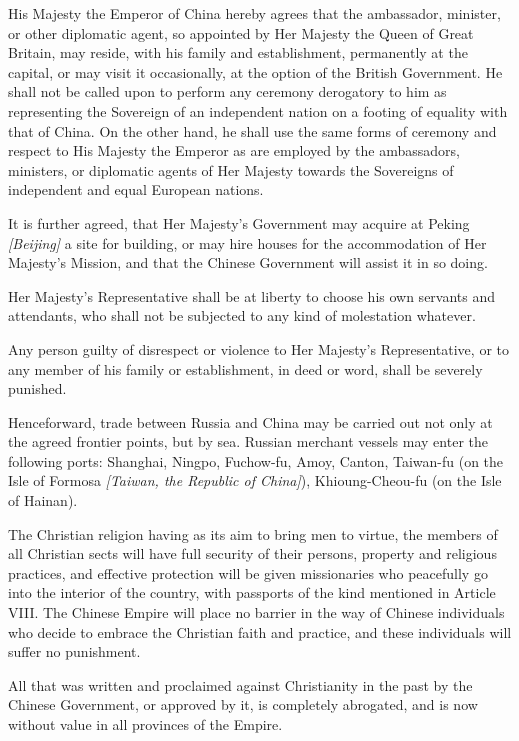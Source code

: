 \begin{fancyquote}
	\vspace*{0.5em}
	\vspace*{0.5em}
	
	His Majesty the Emperor of China hereby agrees that the ambassador, minister, or other diplomatic agent, so appointed by Her Majesty the Queen of Great Britain, may reside, with his family and establishment, permanently at the capital, or may visit it occasionally, at the option of the British Government. He shall not be called upon to perform any ceremony derogatory to him as representing the Sovereign of an independent nation on a footing of equality with that of China. On the other hand, he shall use the same forms of ceremony and respect to His Majesty the Emperor as are employed by the ambassadors, ministers, or diplomatic agents of Her Majesty towards the Sovereigns of independent and equal European nations.
	
	It is further agreed, that Her Majesty's Government may acquire at Peking \emph{[Beijing]} a site for building, or may hire houses for the accommodation of Her Majesty's Mission, and that the Chinese Government will assist it in so doing.
	
	Her Majesty's Representative shall be at liberty to choose his own servants and attendants, who shall not be subjected to any kind of molestation whatever.
	
	Any person guilty of disrespect or violence to Her Majesty's Representative, or to any member of his family or establishment, in deed or word, shall be severely punished. \emph{\autocite{HKPress:1912}}

	\clearpage
	
	Henceforward, trade between Russia and China may be carried out not only at the agreed frontier points, but by sea. Russian merchant vessels may enter the following ports: Shanghai, Ningpo, Fuchow-fu, Amoy, Canton, Taiwan-fu (on the Isle of Formosa \emph{[Taiwan, the Republic of China]}), Khioung-Cheou-fu (on the Isle of Hainan).
	\emph{\autocite{Adamov:1952}}
	
	
	The Christian religion having as its aim to bring men to virtue, the members of all Christian sects will have full security of their persons, property and religious practices, and effective protection will be given missionaries who peacefully go into the interior of the country, with passports of the kind mentioned in Article VIII. The Chinese Empire will place no barrier in the way of Chinese individuals who decide to embrace the Christian faith and practice, and these individuals will suffer no punishment.

	All that was written and proclaimed against Christianity in the past by the Chinese Government, or approved by it, is completely abrogated, and is now without value in all provinces of the Empire. \emph{\autocite{Chassiron:1861}}
\end{fancyquote}
